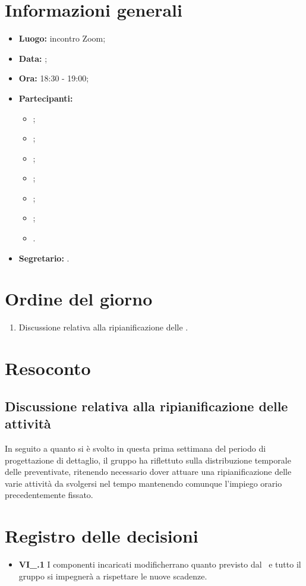 \section{Informazioni generali}
\begin{itemize}
	\item \textbf{Luogo:} incontro Zoom;
	\item \textbf{Data:} \Data;
	\item \textbf{Ora:} 18:30 - 19:00;
	\item \textbf{Partecipanti:}
	\begin{itemize}
		\item \BL{}; 
		\item \FF{};
		\item \MM{}; 
		\item \PC{};
		\item \TG{};
		\item \TL{};
		\item \VD{}.
	\end{itemize} 
	\item \textbf{Segretario:} \BL{}.
\end{itemize}

\section{Ordine del giorno}
\begin{enumerate}
	\item Discussione relativa alla ripianificazione delle .
\end{enumerate}

\section{Resoconto}
\subsection{Discussione relativa alla ripianificazione delle attività}
In seguito a quanto si è svolto in questa prima settimana del periodo di progettazione di dettaglio, il gruppo ha riflettuto sulla distribuzione temporale delle  preventivate, ritenendo necessario dover attuare una ripianificazione delle varie attività da svolgersi nel tempo mantenendo comunque l'impiego orario precedentemente fissato.

\section{Registro delle decisioni}
\begin{itemize}
	\item \textbf{VI\_\Data.1} I componenti incaricati modificherrano quanto previsto dal \PdP\ e tutto il gruppo si impegnerà a rispettare le nuove scadenze.
\end{itemize}